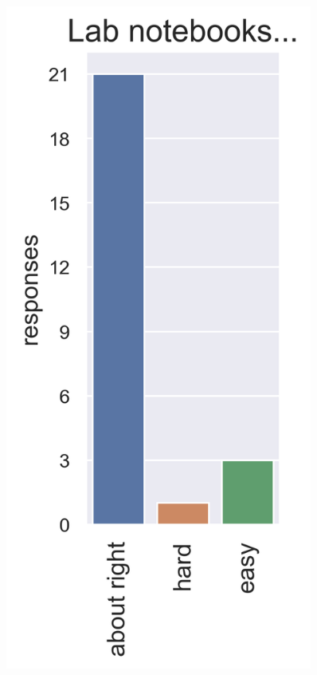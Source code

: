 \documentclass[aspectratio=169, handout]{beamer}
\begin{document}
\begin{frame}[t]
\begin{columns}
\begin{figure}
\includegraphics[width=0.9\textwidth]{survey_lab_notebooks}
\caption*{}
\end{figure}


\end{columns}
\end{frame}
\end{document}

